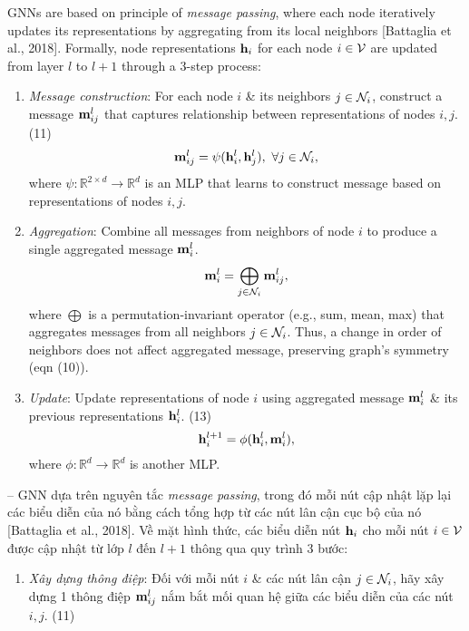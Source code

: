 \documentclass{article}
\begin{document}
\begin{itemize}
\begin{itemize}
        GNNs are based on principle of {\it message passing}, where each node iteratively updates its representations by aggregating from its local neighbors [Battaglia et al., 2018]. Formally, node representations ${\bf h}_i$ for each node $i\in{\cal V}$ are updated from layer $l$ to $l + 1$ through a 3-step process:
        \begin{enumerate}
            \item {\it Message construction}: For each node $i$ \& its neighbors $j\in{\cal N}_i$, construct a message ${\bf m}_{ij}^l$ that captures relationship between representations of nodes $i,j$. (11)
            \begin{equation*}
                {\bf m}_{ij}^l = \psi({\bf h}_i^l,{\bf h}_j^l),\ \forall j\in{\cal N}_i,
            \end{equation*}
            where $\psi:\mathbb{R}^{2\times d}\to\mathbb{R}^d$ is an MLP that learns to construct message based on representations of nodes $i,j$.
            \item {\it Aggregation}: Combine all messages from neighbors of node $i$ to produce a single aggregated message ${\bf m}_i^l$.
            \begin{equation*}
                {\bf m}_i^l = \bigoplus_{j\in{\cal N}_i} {\bf m}_{ij}^l,
            \end{equation*}
            where $\bigoplus$ is a permutation-invariant operator (e.g., sum, mean, max) that aggregates messages from all neighbors $j\in{\cal N}_i$. Thus, a change in order of neighbors does not affect aggregated message, preserving graph's symmetry (eqn (10)).
            \item {\it Update}: Update representations of node $i$ using aggregated message ${\bf m}_i^l$ \& its previous representations ${\bf h}_i^l$. (13)
            \begin{equation*}
                {\bf h}_i^{l+1} = \phi({\bf h}_i^l,{\bf m}_i^l),
            \end{equation*}
            where $\phi:\mathbb{R}^d\to\mathbb{R}^d$ is another MLP.
        \end{enumerate}
        -- GNN dựa trên nguyên tắc {\it message passing}, trong đó mỗi nút cập nhật lặp lại các biểu diễn của nó bằng cách tổng hợp từ các nút lân cận cục bộ của nó [Battaglia et al., 2018]. Về mặt hình thức, các biểu diễn nút ${\bf h}_i$ cho mỗi nút $i\in{\cal V}$ được cập nhật từ lớp $l$ đến $l + 1$ thông qua quy trình 3 bước:
        \begin{enumerate}
            \item {\it Xây dựng thông điệp}: Đối với mỗi nút $i$ \& các nút lân cận $j\in{\cal N}_i$, hãy xây dựng 1 thông điệp ${\bf m}_{ij}^l$ nắm bắt mối quan hệ giữa các biểu diễn của các nút $i,j$. (11)

\end{enumerate}
\end{itemize}
\end{itemize}
\end{document}
